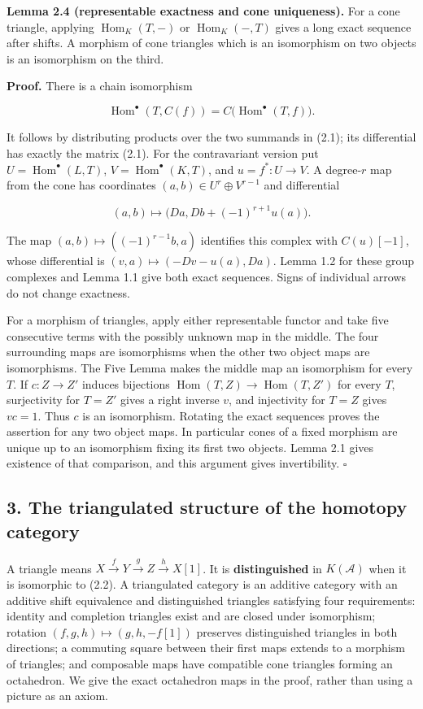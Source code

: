 \documentclass[
  english,
  11pt,
  a4paper,
]{article}
\begin{document}
\textbf{Lemma 2.4 (representable exactness and cone uniqueness).} For a
cone triangle, applying \(\operatorname{Hom}_K(T,-)\) or
\(\operatorname{Hom}_K(-,T)\) gives a long exact sequence after shifts.
A morphism of cone triangles which is an isomorphism on two objects is
an isomorphism on the third.

\textbf{Proof.} There is a chain isomorphism

\[\operatorname{Hom}^{\bullet}(T,C(f))
=C\bigl(\operatorname{Hom}^{\bullet}(T,f)\bigr).\]

It follows by distributing products over the two summands in (2.1); its
differential has exactly the matrix (2.1). For the contravariant version
put \(U=\operatorname{Hom}^{\bullet}(L,T)\),
\(V=\operatorname{Hom}^{\bullet}(K,T)\), and \(u=f^*:U\to V\). A
degree-\(r\) map from the cone has coordinates
\((a,b)\in U^r\oplus V^{r-1}\) and differential

\[(a,b)\longmapsto\bigl(Da,Db+(-1)^{r+1}u(a)\bigr).\]

The map \((a,b)\mapsto((-1)^{r-1}b,a)\) identifies this complex with
\(C(u)[-1]\), whose differential is \((v,a)\mapsto(-Dv-u(a),Da)\). Lemma
1.2 for these group complexes and Lemma 1.1 give both exact sequences.
Signs of individual arrows do not change exactness.

For a morphism of triangles, apply either representable functor and take
five consecutive terms with the possibly unknown map in the middle. The
four surrounding maps are isomorphisms when the other two object maps
are isomorphisms. The Five Lemma makes the middle map an isomorphism for
every \(T\). If \(c:Z\to Z'\) induces bijections
\(\operatorname{Hom}(T,Z)\to\operatorname{Hom}(T,Z')\) for every \(T\),
surjectivity for \(T=Z'\) gives a right inverse \(v\), and injectivity
for \(T=Z\) gives \(vc=1\). Thus \(c\) is an isomorphism. Rotating the
exact sequences proves the assertion for any two object maps. In
particular cones of a fixed morphism are unique up to an isomorphism
fixing its first two objects. Lemma 2.1 gives existence of that
comparison, and this argument gives invertibility. \(\square\)

\subsection{3. The triangulated structure of the homotopy
category}\label{complexes-cones-and-localization--3-the-triangulated-structure-of-the-homotopy-category}

A triangle means \(X\xrightarrow fY\xrightarrow gZ\xrightarrow hX[1]\).
It is \textbf{distinguished} in \(K(\mathcal A)\) when it is isomorphic
to (2.2). A triangulated category is an additive category with an
additive shift equivalence and distinguished triangles satisfying four
requirements: identity and completion triangles exist and are closed
under isomorphism; rotation \((f,g,h)\mapsto(g,h,-f[1])\) preserves
distinguished triangles in both directions; a commuting square between
their first maps extends to a morphism of triangles; and composable maps
have compatible cone triangles forming an octahedron. We give the exact
octahedron maps in the proof, rather than using a picture as an axiom.
\end{document}
